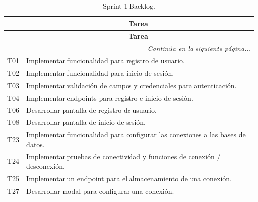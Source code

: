 \begin{longtable}[c]{|c|m{}|}
    \caption{Sprint 1 Backlog.}
    \label{tab:sprintBacklog1} \\
    
    \hline
    \rowcolor{gray!50}
    \multicolumn{1}{|c|}{\textbf{Código}} & \multicolumn{1}{c|}{\textbf{Tarea}} \\
    \hline
    \endfirsthead

    \hline
    \rowcolor{gray!50}
    \multicolumn{1}{|c|}{\textbf{Código}} & \multicolumn{1}{c|}{\textbf{Tarea}} \\
    \hline
    \endhead

    \multicolumn{2}{r}{\textit{Continúa en la siguiente página...}} \\
    \endfoot
    
    \endlastfoot

    T01 & Implementar funcionalidad para registro de usuario. \\
    \hline
    T02 & Implementar funcionalidad para inicio de sesión. \\
    \hline
    T03 & Implementar validación de campos y credenciales para autenticación. \\
    \hline
    T04 & Implementar endpoints para registro e inicio de sesión. \\
    \hline
    T06 & Desarrollar pantalla de registro de usuario. \\
    \hline
    T08 & Desarrollar pantalla de inicio de sesión. \\
    \hline
    T23 & Implementar funcionalidad para configurar las conexiones a las bases de datos. \\
    \hline
    T24 & Implementar pruebas de conectividad y funciones de conexión / desconexión. \\
    \hline
    T25 & Implementar un endpoint para el almacenamiento de una conexión. \\
    \hline
    T27 & Desarrollar modal para configurar una conexión. \\
    \hline
\end{longtable}